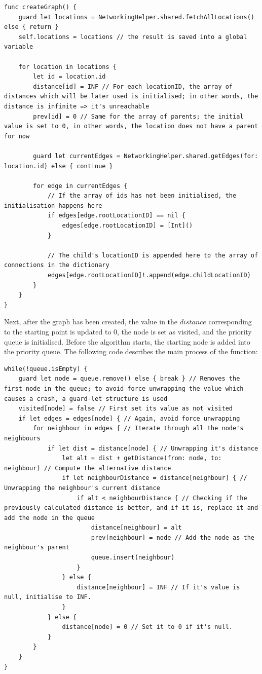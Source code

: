 \begin{lstlisting}
func createGraph() {
    guard let locations = NetworkingHelper.shared.fetchAllLocations() else { return }
    self.locations = locations // the result is saved into a global variable
    
    for location in locations {
        let id = location.id
        distance[id] = INF // For each locationID, the array of distances which will be later used is initialised; in other words, the distance is infinite => it's unreachable
        prev[id] = 0 // Same for the array of parents; the initial value is set to 0, in other words, the location does not have a parent for now

        guard let currentEdges = NetworkingHelper.shared.getEdges(for: location.id) else { continue }

        for edge in currentEdges {
            // If the array of ids has not been initialised, the initialisation happens here
            if edges[edge.rootLocationID] == nil {
                edges[edge.rootLocationID] = [Int]()
            }

            // The child's locationID is appended here to the array of connections in the dictionary
            edges[edge.rootLocationID]!.append(edge.childLocationID)
        }
    }
}
\end{lstlisting}

Next, after the graph has been created, the value in the $distance$ corresponding to the starting point is updated to 0, the node is set as visited, and the priority queue is initialised. Before the algorithm starts, the starting node is added into the priority queue. The following code describes the main process of the function:

\begin{lstlisting}
while(!queue.isEmpty) {
    guard let node = queue.remove() else { break } // Removes the first node in the queue; to avoid force unwrapping the value which causes a crash, a guard-let structure is used
    visited[node] = false // First set its value as not visited
    if let edges = edges[node] { // Again, avoid force unwrapping
        for neighbour in edges { // Iterate through all the node's neighbours
            if let dist = distance[node] { // Unwrapping it's distance
                let alt = dist + getDistance(from: node, to: neighbour) // Compute the alternative distance
                if let neighbourDistance = distance[neighbour] { // Unwrapping the neighbour's current distance
                    if alt < neighbourDistance { // Checking if the previously calculated distance is better, and if it is, replace it and add the node in the queue
                        distance[neighbour] = alt
                        prev[neighbour] = node // Add the node as the neighbour's parent
                        queue.insert(neighbour)
                    }
                } else {
                    distance[neighbour] = INF // If it's value is null, initialise to INF.
                }
            } else {
                distance[node] = 0 // Set it to 0 if it's null.
            }
        }
    }
}
\end{lstlisting}

